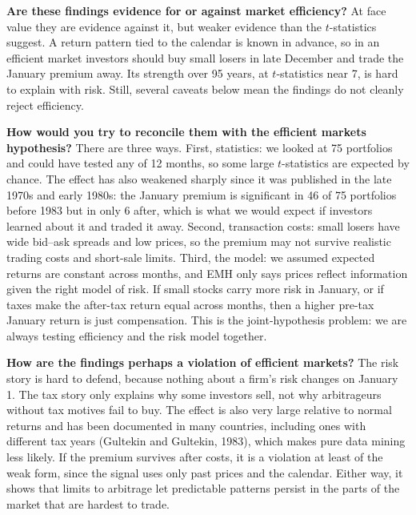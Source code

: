 \begin{tight}
  \item \textbf{Are these findings evidence for or against market efficiency?} At face value
  they are evidence against it, but weaker evidence than the $t$-statistics suggest. A return
  pattern tied to the calendar is known in advance, so in an efficient market investors should
  buy small losers in late December and trade the January premium away. Its strength over 95 years, at
  $t$-statistics near 7, is hard to explain with risk. Still, several caveats
  below mean the findings do not cleanly reject efficiency.

  \item \textbf{How would you try to reconcile them with the efficient markets hypothesis?}
  There are three ways. First, statistics: we looked at 75 portfolios and could have tested
  any of 12 months, so some large $t$-statistics are expected by chance. The effect has also
  weakened sharply since it was published in the late 1970s and early 1980s: the January
  premium is significant in 46 of 75 portfolios before 1983 but in only 6 after, which is what
  we would expect if investors learned about it and traded it away. Second, transaction costs: small losers
  have wide bid--ask spreads and low prices, so the premium may not survive realistic trading
  costs and short-sale limits. Third, the model: we assumed expected returns are constant across
  months, and EMH only says prices reflect information given the right model of risk. If small
  stocks carry more risk in January, or if taxes make the after-tax return equal across months,
  then a higher pre-tax January return is just compensation. This is the joint-hypothesis
  problem: we are always testing efficiency and the risk model together.

  \item \textbf{How are the findings perhaps a violation of efficient markets?} The risk story
  is hard to defend, because nothing about a firm's risk changes on January 1. The tax story
  only explains why some investors sell, not why arbitrageurs without tax motives fail to buy.
  The effect is also very large relative to normal returns and has been documented in many
  countries, including ones with different tax years (Gultekin and Gultekin, 1983), which makes pure data mining less
  likely. If the premium survives after costs, it is a violation at least of the weak form,
  since the signal uses only past prices and the calendar. Either way, it shows that limits to
  arbitrage let predictable patterns persist in the parts of the market that are hardest to
  trade.
\end{tight}
